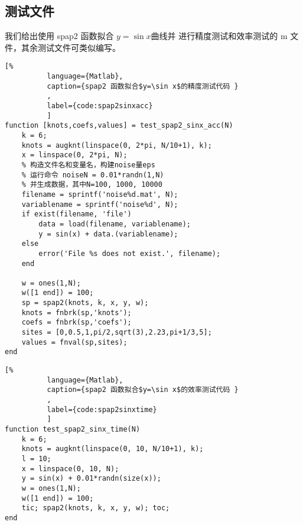 \cleardoublepage

{

    \appendixsubsecmajornumbering

    \subsection{测试文件}
    我们给出使用 spap2 函数拟合 $y=\sin x$曲线并
    进行精度测试和效率测试的 m 文件，其余测试文件可类似编写。
        \begin{lstlisting}[%
          language={Matlab},
          caption={spap2 函数拟合$y=\sin x$的精度测试代码 }
          ,
          label={code:spap2sinxacc}
          ]
function [knots,coefs,values] = test_spap2_sinx_acc(N)
    k = 6;
    knots = augknt(linspace(0, 2*pi, N/10+1), k); 
    x = linspace(0, 2*pi, N);
    % 构造文件名和变量名，构建noise量eps
    % 运行命令 noiseN = 0.01*randn(1,N)
    % 并生成数据，其中N=100, 1000, 10000
    filename = sprintf('noise%d.mat', N);
    variablename = sprintf('noise%d', N);
    if exist(filename, 'file')
        data = load(filename, variablename);
        y = sin(x) + data.(variablename);
    else
        error('File %s does not exist.', filename);
    end
    
    w = ones(1,N);
    w([1 end]) = 100;
    sp = spap2(knots, k, x, y, w); 
    knots = fnbrk(sp,'knots');
    coefs = fnbrk(sp,'coefs');
    sites = [0,0.5,1,pi/2,sqrt(3),2.23,pi+1/3,5];
    values = fnval(sp,sites);
end
        \end{lstlisting}


       \begin{lstlisting}[%
          language={Matlab},
          caption={spap2 函数拟合$y=\sin x$的效率测试代码 }
          ,
          label={code:spap2sinxtime}
          ]
function test_spap2_sinx_time(N)
    k = 6; 
    knots = augknt(linspace(0, 10, N/10+1), k);
    l = 10;
    x = linspace(0, 10, N);
    y = sin(x) + 0.01*randn(size(x));
    w = ones(1,N);
    w([1 end]) = 100;
    tic; spap2(knots, k, x, y, w); toc;
end
        \end{lstlisting}






}

